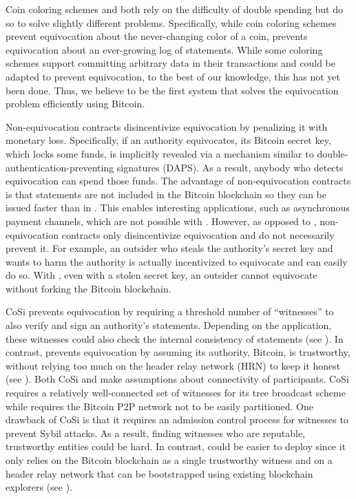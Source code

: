 Coin coloring schemes and \Sys both rely on the difficulty of double spending but do so to solve slightly different problems.
Specifically, while coin coloring schemes prevent equivocation about the never-changing color of a coin, \Sys prevents equivocation about an ever-growing log of statements.
While some coloring schemes support committing arbitrary data in their transactions\cite{coloredcoins-metadata} and could be adapted to prevent equivocation, to the best of our knowledge, this has not yet been done.
Thus, we believe \Sys to be the first system that solves the equivocation problem efficiently using Bitcoin.

Non-equivocation contracts\cite{liarliar} disincentivize equivocation by penalizing it with monetary loss.
Specifically, if an authority equivocates, its Bitcoin secret key, which locks some funds, is implicitly revealed via a mechanism similar to double-authentication-preventing signatures (DAPS)\cite{daps}.
As a result, anybody who detects equivocation can spend those funds.
The advantage of non-equivocation contracts is that statements are not included in the Bitcoin blockchain so they can be issued faster than in \Sys.
This enables interesting applications, such as asynchronous payment channels\cite{liarliar}, which are not possible with \Sys.
However, as opposed to \Sys, non-equivocation contracts only disincentivize equivocation and do not necessarily prevent it.
For example, an outsider who steals the authority's secret key and wants to harm the authority is actually incentivized to equivocate and can easily do so.
With \Sys, even with a stolen secret key, an outsider cannot equivocate without forking the Bitcoin blockchain.

CoSi\cite{cosi} prevents equivocation by requiring a threshold number of ``witnesses'' to also verify and sign an authority's statements.
Depending on the application, these witnesses could also check the internal consistency of statements (see ). 
In contrast, \Sys prevents equivocation by assuming its authority, Bitcoin, is trustworthy, without relying too much on the header relay network (HRN) to keep it honest (see ).
Both CoSi and \Sys make assumptions about connectivity of participants.
CoSi requires a relatively well-connected set of witnesses for its tree broadcast scheme while \Sys requires the Bitcoin P2P network not to be easily partitioned.
One drawback of CoSi is that it requires an admission control process for witnesses to prevent Sybil attacks\cite{sybil}.
As a result, finding witnesses who are reputable, trustworthy entities could be hard.
In contrast, \Sys could be easier to deploy since it only relies on the Bitcoin blockchain as a single trustworthy witness and on a header relay network that can be bootstrapped using existing blockchain explorers (see ).

